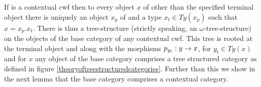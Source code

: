 

\newcommand{\qstarstructure}{q$^*$-structure}
\newcommand{\sqstarstructure}{sq$^*$-structure}
\note
If \catcw is a contextual cwf then to every object $x$ of \catcw other than the specified terminal object there is  uniquely an object $x_p$ of \catcw and a type $x_t \in Ty(x_p)$ such that $x=x_p.x_t$.
There is thus a tree-structure (strictly speaking, an $\omega$-tree-structure)  on the objects of the base category of any contextual cwf. This tree is rooted at the terminal object
and along with the morphisms $p_{y_t}: y \rightarrow x$, for $y_t \in Ty(x)$ and for
 $x$ any object of the base category comprises  a tree structured category as defined in figure \ref{theoryoftreestructuredcategories}.
Further than this we show in the next lemma that the base category comprises a contextual category.

